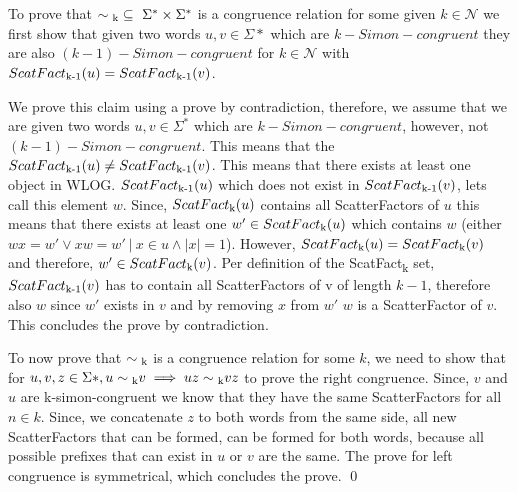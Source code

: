 \documentclass[a4paper,12pt,numbers=noenddot]{scrreport}
\begin{document}
\section{}

To prove that $\sim\textsubscript{k} \subseteq~ \Sigma^* \times \Sigma^*$ is a congruence relation for some given $k \in \mathcal{N}$ we first show that given two words $u, v \in \Sigma*$ which are $k-Simon-congruent$ they are also $(k-1)-Simon-congruent$ for $k \in \mathcal{N}$ with $ScatFact\textsubscript{k-1}(u) = ScatFact\textsubscript{k-1}(v)$.

We prove this claim using a prove by contradiction, therefore, we assume that we are given two words $u, v \in \Sigma^*$ which are $k-Simon-congruent$, however, not $(k-1)-Simon-congruent$.
This means that the $ScatFact\textsubscript{k-1}(u) \neq ScatFact\textsubscript{k-1}(v)$. This means that there exists at least one object in WLOG. $ScatFact\textsubscript{k-1}(u)$ which does not exist in $ScatFact\textsubscript{k-1}(v)$, lets call this element $w$.
Since, $ScatFact\textsubscript{k}(u)$ contains all ScatterFactors of $u$ this means that there exists at least one $w' \in ScatFact\textsubscript{k}(u)$ which contains $w$ (either $wx = w' \lor xw = w' ~|~ x \in u \land |x| = 1$).
However, $ScatFact\textsubscript{k}(u) = ScatFact\textsubscript{k}(v)$ and therefore, $w' \in ScatFact\textsubscript{k}(v)$.
Per definition of the ScatFact\textsubscript{k} set, $ScatFact\textsubscript{k-1}(v)$ has to contain all ScatterFactors of v of length $k-1$, therefore also $w$ since $w'$ exists in $v$ and by removing $x$ from $w'$ $w$ is a ScatterFactor of $v$.
This concludes the prove by contradiction.

To now prove that $\sim\textsubscript{k}$ is a congruence relation for some $k$, we need to show that for $u,v,z \in \Sigma*, u \sim\textsubscript{k} v \implies uz \sim\textsubscript{k} vz$ to prove the right congruence.
Since, $v$ and $u$ are k-simon-congruent we know that they have the same ScatterFactors for all $n \in k$.
Since, we concatenate $z$ to both words from the same side, all new ScatterFactors that can be formed, can be formed for both words, because all possible prefixes that can exist in $u$ or $v$ are the same.
The prove for left congruence is symmetrical, which concludes the prove.
\qed
\end{document}
